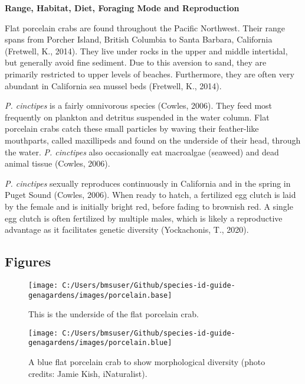 \documentclass[
]{article}
\begin{document}
\textbf{Range, Habitat, Diet, Foraging Mode and Reproduction}

Flat porcelain crabs are found throughout the Pacific Northwest. Their
range spans from Porcher Island, British Columbia to Santa Barbara,
California (Fretwell, K., 2014). They live under rocks in the upper and
middle intertidal, but generally avoid fine sediment. Due to this
aversion to sand, they are primarily restricted to upper levels of
beaches. Furthermore, they are often very abundant in California sea
mussel beds (Fretwell, K., 2014).

\emph{P. cinctipes} is a fairly omnivorous species (Cowles, 2006). They
feed most frequently on plankton and detritus suspended in the water
column. Flat porcelain crabs catch these small particles by waving their
feather-like mouthparts, called maxillipeds and found on the underside
of their head, through the water. \emph{P. cinctipes} also occasionally
eat macroalgae (seaweed) and dead animal tissue (Cowles, 2006).

\emph{P. cinctipes} sexually reproduces continuously in California and
in the spring in Puget Sound (Cowles, 2006). When ready to hatch, a
fertilized egg clutch is laid by the female and is initially bright red,
before fading to brownish red. A single egg clutch is often fertilized
by multiple males, which is likely a reproductive advantage as it
facilitates genetic diversity (Yockachonis, T., 2020).

\newpage

\hypertarget{figures-1}{%
\subsection{Figures}\label{figures-1}}

\begin{figure}

\texttt{[image: C:/Users/bmsuser/Github/species-id-guide-genagardens/images/porcelain.base]} \hfill{}

\caption{This is the underside of the flat porcelain crab.}\label{fig:porcelain.base}
\end{figure}

\begin{figure}

\texttt{[image: C:/Users/bmsuser/Github/species-id-guide-genagardens/images/porcelain.blue]} \hfill{}

\caption{A blue flat porcelain crab to show morphological diversity (photo credits: Jamie Kish, iNaturalist).}\label{fig:blue.porcelain}
\end{figure}
\end{document}

